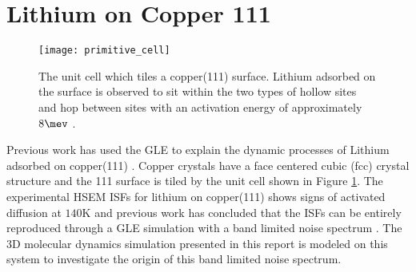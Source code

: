 \pagebreak

\section{Lithium on Copper 111}

\begin{figure}
	\centering
	\texttt{[image: primitive\_cell]}
	\caption{The unit cell which tiles a copper(111) surface. Lithium adsorbed on the surface is observed to sit within the two types of hollow sites and hop between sites with an activation energy of approximately $8\mev$ \cite{Ward}.}
	\label{fig:fcc_111_unit_cell}
\end{figure}

Previous work has used the GLE to explain the dynamic processes of Lithium adsorbed on copper(111) \cite{Ward}. Copper crystals have a face centered cubic (fcc) crystal structure and the 111 surface is tiled by the unit cell shown in Figure \ref{fig:fcc_111_unit_cell}. The experimental HSEM ISFs for lithium on copper(111) shows signs of activated diffusion at $140\si{\kelvin}$ and previous work has concluded that the ISFs can be entirely reproduced through a GLE simulation with a band limited noise spectrum \cite{Ward}. The 3D molecular dynamics simulation presented in this report is modeled on this system to investigate the origin of this band limited noise spectrum. 
